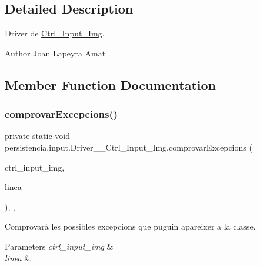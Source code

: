 \subsection{Detailed Description}
Driver de \hyperlink{classpersistencia_1_1input_1_1Ctrl__Input__Img}{Ctrl\+\_\+\+Input\+\_\+\+Img}. 

\begin{DoxyAuthor}{Author}
Joan Lapeyra Amat 
\end{DoxyAuthor}


\subsection{Member Function Documentation}
\mbox{\label{classpersistencia_1_1input_1_1Driver____Ctrl__Input__Img_a60b4011cee02b5c7fc213230db46d6e0}} 
\subsubsection{\texorpdfstring{comprovar\+Excepcions()}{comprovarExcepcions()}}
{\footnotesize\ttfamily private static void persistencia.\+input.\+Driver\+\_\+\+\_\+\+Ctrl\+\_\+\+Input\+\_\+\+Img.\+comprovar\+Excepcions (\begin{DoxyParamCaption}\item[{\hyperlink{classpersistencia_1_1input_1_1Ctrl__Input__Img}{Ctrl\+\_\+\+Input\+\_\+\+Img}}]{ctrl\+\_\+input\+\_\+img,  }\item[{String}]{linea }\end{DoxyParamCaption})\hspace{0.3cm}{\ttfamily [inline]}, {\ttfamily [static]}, {\ttfamily [private]}}



Comprovarà les possibles excepcions que puguin apareixer a la classe. 


\begin{DoxyParams}{Parameters}
{\em ctrl\+\_\+input\+\_\+img} & \\
\hline
{\em linea} & \\
\hline
\end{DoxyParams}


